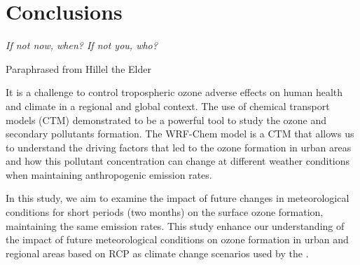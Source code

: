 \chapter{\bf Conclusions}\label{chap:concl}

\epigraph{\textit{If not now, when? If not you, who?}}{Paraphrased from Hillel the Elder}
It is a challenge to control tropospheric ozone adverse effects on human health and climate in a regional and global context.
The use of chemical transport models (CTM) demonstrated to be a powerful tool to study the ozone and secondary pollutants formation.
The WRF-Chem model is a CTM that allows us to understand the driving factors that led to the ozone formation in urban areas and how this pollutant concentration can change at different weather conditions when maintaining anthropogenic emission rates.

In this study, we aim to examine the impact of future changes in meteorological conditions for short periods (two months) on the surface ozone formation, maintaining the same emission rates. 
This study enhance our understanding of the impact of future meteorological conditions on ozone formation in urban and regional areas based on RCP as climate change scenarios used by the \citet{IPCC2013}.

